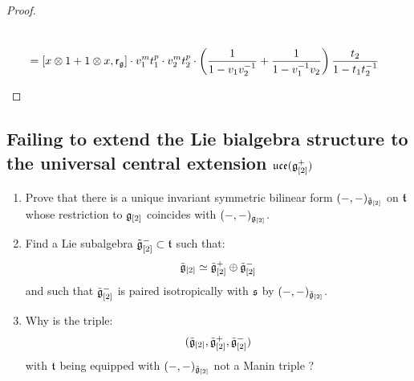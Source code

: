 \begin{proof}
\begin{enumerate}
$$\begin{aligned}
                                    \\
                                    & = [x \tensor 1 + 1 \tensor x, \sfr_{\g}] \cdot v_1^m t_1^p \cdot v_2^m t_2^p \cdot \left( \frac{1}{1 - v_1 v_2^{-1}} + \frac{1}{1 - v_1^{-1} v_2} \right) \frac{t_2}{1 - t_1 t_2^{-1}}
                                \end{aligned}
                            $$
                    \end{enumerate}
                \end{proof}

        \subsection{Failing to extend the Lie bialgebra structure to the universal central extension \texorpdfstring{$\mathfrak{uce}( \mathfrak{g}_{[2]}^+ )$}{}}
            \begin{question} \label{question: extending_invariant_inner_products_on_multi_loop_to_universal_central_extensions}
                \begin{enumerate}
                    \item Prove that there is a unique invariant symmetric bilinear form $(-, -)_{\tilde{\mathfrak{g}}_{[2]}}$ on $\mathfrak{t}$ whose restriction to $\mathfrak{g}_{[2]}$ coincides with $(-, -)_{\mathfrak{g}_{[2]}}$.
                    \item Find a Lie subalgebra $\tilde{\mathfrak{g}}_{[2]}^- \subset \mathfrak{t}$ such that:
                        $$\tilde{\mathfrak{g}}_{[2]}\simeq \tilde{\mathfrak{g}}_{[2]}^+\oplus \tilde{\mathfrak{g}}_{[2]}^-$$
                    and such that $\tilde{\mathfrak{g}}_{[2]}^-$ is paired isotropically with $\mathfrak{s}$ by $(-, -)_{\tilde{\mathfrak{g}}_{[2]}}$. 
                    \item Why is the triple:
                        $$(\tilde{\mathfrak{g}}_{[2]}, \tilde{\mathfrak{g}}_{[2]}^+, \tilde{\mathfrak{g}}_{[2]}^-)$$
                    with $\mathfrak{t}$ being equipped with $(-, -)_{\tilde{\mathfrak{g}}_{[2]}}$ not a Manin triple ?
                \end{enumerate}
            \end{question}
